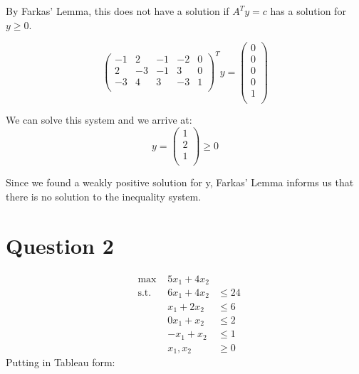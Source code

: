\documentclass[10pt, letterpaper]{paper}
\begin{document}
	
By Farkas' Lemma, this does not have a solution if $A^T y = c$ has a solution for $y \geq 0$.

\[
\left ( { \begin{array}{ccccc}
	-1 & 2 & -1 & -2 & 0 \\
	2 & -3 & -1& 3 & 0\\
	-3 & 4 & 3 & -3 & 1\\
	\end{array}}\right)^T y =  \left( { \begin{array}{c}
	0\\
	0\\
	0\\
	0\\
	1\\
	\end{array}} \right)
\]

We can solve this system and we arrive at:
\[
y = \left ( {\begin{array}{c}
	1\\
	2\\
	1\\
	\end{array}} \right ) \geq 0 \]
	
Since we found a weakly positive solution for y, Farkas' Lemma informs us that there is no solution to the inequality system.

\section*{Question 2}
\begin{equation*}
\begin{alignedat}{3}
&\text{max }&5x_1 + 4x_2&\\
&\text{s.t. } &6x_1 + 4x_2 &\leq 24\\
& &x_1 + 2x_2 &\leq 6\\
& &0x_1 + x_2 &\leq 2\\
& &-x_1 + x_2 &\leq 1\\
& &x_1, x_2 &\geq 0
\end{alignedat}
\end{equation*}
Putting in Tableau form:
\end{document}
